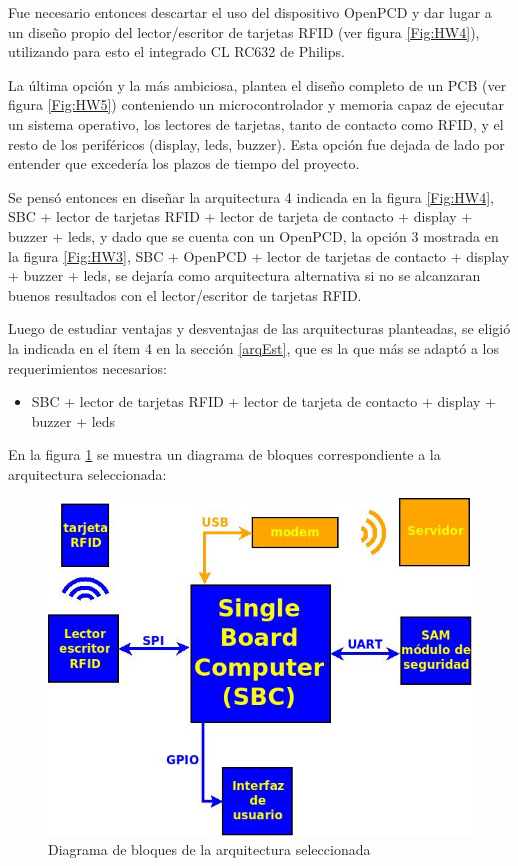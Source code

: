 Fue necesario entonces descartar el uso del dispositivo OpenPCD y dar lugar a un diseño propio del lector/escritor de tarjetas RFID (ver figura \ref{Fig:HW4}), utilizando para esto el integrado CL RC632 de Philips.

La última opción y la más ambiciosa, plantea el diseño completo de un PCB (ver figura \ref{Fig:HW5}) conteniendo un microcontrolador y memoria capaz de ejecutar un sistema operativo, los lectores de tarjetas, tanto de contacto como RFID, y el resto de los periféricos (display, leds, buzzer). Esta opción fue dejada de lado por entender que excedería los plazos de tiempo del proyecto.

Se pensó entonces en diseñar la arquitectura 4 indicada en la figura \ref{Fig:HW4}, SBC + lector de tarjetas RFID + lector de tarjeta de contacto + display + buzzer + leds, y dado que se cuenta con un OpenPCD, la opción 3 mostrada en la figura \ref{Fig:HW3}, SBC + OpenPCD + lector de tarjetas de contacto + display + buzzer + leds, se dejaría como arquitectura alternativa si no se alcanzaran buenos resultados con el lector/escritor de tarjetas RFID.

\bigskip
Luego de estudiar ventajas y desventajas de las arquitecturas planteadas, se eligió la indicada en el ítem 4 en la sección \ref{arqEst}, que es la que más se adaptó a los requerimientos necesarios:

\begin{itemize}
\item SBC +  lector de tarjetas RFID + lector de tarjeta de contacto + display + buzzer + leds
\end{itemize}

En la figura \ref{Fig:HW_GRAL} se muestra un diagrama de bloques correspondiente a la arquitectura seleccionada:

\begin{figure}[H]
\centering
  \begin{center}
  \includegraphics[scale=.5]{Imagenes/diagrama_rf2.jpg} 
  \end{center}
  \caption{Diagrama de bloques de la arquitectura seleccionada}\label{Fig:HW_GRAL} 
\end{figure}


